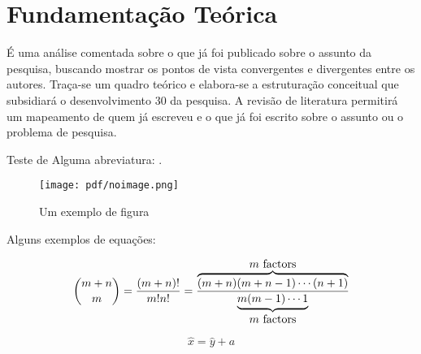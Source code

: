 \chapter{Fundamentação Teórica} \label{cap:fund}

    É uma análise comentada sobre o que já foi publicado sobre o assunto da pesquisa, buscando mostrar os pontos de vista convergentes e divergentes entre os autores. Traça-se um quadro teórico e elabora-se a estruturação conceitual que subsidiará o desenvolvimento  30 da pesquisa. A revisão de literatura permitirá um mapeamento de quem já escreveu e o que já foi escrito sobre o assunto ou o problema de pesquisa.

	Teste de Alguma abreviatura: .

	\begin{figure}[H]
		\centering
		\caption{Um exemplo de figura}
		\texttt{[image: pdf/noimage.png]}
		\label{fig:esquematico_cbi}
	\end{figure}

	Alguns exemplos de equações:

	\[
		\binom{m+n}{m} =
		\frac{(m+n)!}{m!n!} =
		\frac{
			\overbrace{
				(m+n)(m+n-1)\cdots(n+1)
			}^{\clap{$m$ factors}}
		}{
			\underbrace{
				m(m-1)\cdots 1
			}_{\clap{$m$ factors}}}
	\]

	\begin{equation}
		\hat{x} = \hat{y} + a
	\end{equation}


